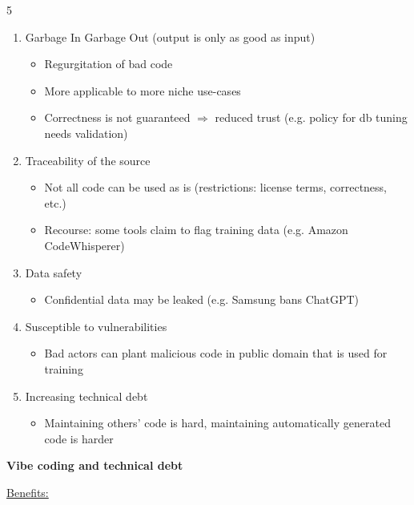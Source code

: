 \documentclass[landscape,a4paper]{extarticle}
\begin{document}
\begin{multicols*}{5}
    \begin{enumerate}
        \item Garbage In Garbage Out (output is only as good as input)
        \begin{itemize}
            \item Regurgitation of bad code
            \item More applicable to more niche use-cases
            \item Correctness is not guaranteed $\Rightarrow$ reduced trust (e.g. policy for db tuning needs validation)
        \end{itemize}
        \item Traceability of the source
        \begin{itemize}
            \item Not all code can be used as is (restrictions: license terms, correctness, etc.)
            \item Recourse: some tools claim to flag training data (e.g. Amazon CodeWhisperer)
        \end{itemize}
        \item Data safety
        \begin{itemize}
            \item Confidential data may be leaked (e.g. Samsung bans ChatGPT)
        \end{itemize}
        \item Susceptible to vulnerabilities
        \begin{itemize}
            \item Bad actors can plant malicious code in public domain that is used for training
        \end{itemize}
        \item Increasing technical debt
        \begin{itemize}
            \item Maintaining others' code is hard, maintaining automatically generated code is harder
        \end{itemize}
    \end{enumerate}

    \textbf{Vibe coding and technical debt}

    \uline{Benefits:}


\end{multicols*}
\end{document}
